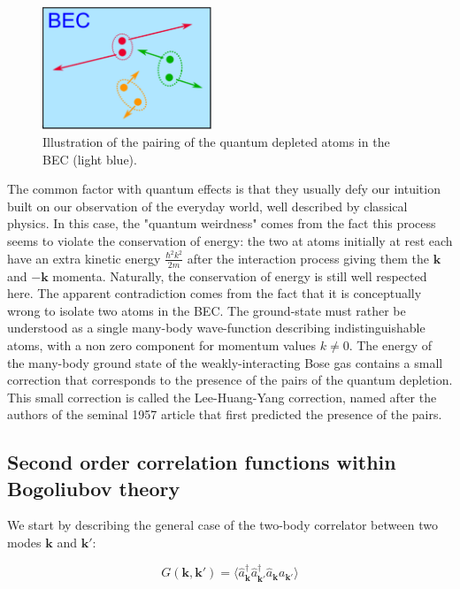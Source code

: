 \begin{figure}
    \centering
    \includegraphics[width=0.45\textwidth]{Fig/Chapter1/pairs.png}
    \caption{Illustration of the \kmk pairing of the quantum depleted atoms in the BEC (light blue).}
    \label{fig:bec_pairs}
\end{figure}

The common factor with quantum effects is that they usually defy our intuition built on our observation of the everyday world, well described by classical physics. In this case, the "quantum weirdness" comes from the fact this process seems to violate the conservation of energy: the two at atoms initially at rest each have an extra kinetic energy $\frac{\hbar^2 k^2}{2m}$ after the interaction process giving them the $\bm{k}$ and $-\bm{k}$ momenta. Naturally, the conservation of energy is still well respected here. The apparent contradiction comes from the fact that it is conceptually wrong to isolate two atoms in the BEC. The ground-state must rather be understood as a single many-body wave-function describing indistinguishable atoms, with a non zero component for momentum values $k \neq 0$. The energy of the many-body ground state of the weakly-interacting Bose gas contains a small correction that corresponds to the presence of the \kmk pairs of the quantum depletion. This small correction is called the Lee-Huang-Yang correction, named after the authors of the seminal 1957 article \cite{lee1957} that first predicted the presence of the \kmk pairs.





\subsection{Second order correlation functions within Bogoliubov theory}

We start by describing the general case of the two-body correlator between two modes $\bm{k}$ and $\bm{k'}$:

\begin{equation}
    G(\bm{k},\bm{k}')=\langle \hat{a}^{\dagger}_{\bm{k}} \hat{a}^{\dagger}_{\bm k'} \hat{a}_{\bm k} a_{\bm {k}'} \rangle
\end{equation}

